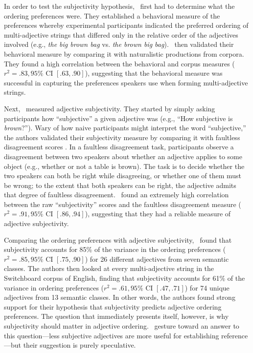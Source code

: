 \documentclass[10pt,a4paper]{article}
\begin{document}
In order to test the subjectivity hypothesis, ~first had to determine what the ordering preferences were. They established a behavioral measure of the preferences whereby experimental participants indicated the preferred ordering of multi-adjective strings that differed only in the relative order of the adjectives involved (e.g., \emph{the big brown bag} vs. \emph{the brown big bag}). ~then validated their behavioral measure by comparing it with naturalistic productions from corpora. They found a high correlation between the behavioral and corpus measures ($r^{2}=.83, 95\%$ CI $[.63, .90]$), suggesting that the behavioral measure was successful in capturing the preferences speakers use when forming multi-adjective strings.

Next, ~measured adjective subjectivity. They started by simply asking participants how ``subjective'' a given adjective was (e.g., ``How subjective is \emph{brown}?''). Wary of how naive participants might interpret the word ``subjective,'' the authors validated their subjectivity measure by comparing it with faultless disagreement scores \cite{kolbel2004,barker2013,kennedy2013,macfarlane2014}. In a faultless disagreement task, participants observe a disagreement between two speakers about whether an adjective applies to some object (e.g., whether or not a table is brown). The task is to decide whether the two speakers can both be right while disagreeing, or whether one of them must be wrong; to the extent that both speakers can be right, the adjective admits that degree of faultless disagreement. ~found an extremely high correlation between the raw ``subjectivity'' scores and the faultless disagreement measure ($r^{2}=.91, 95\%$ CI $[.86, .94]$), suggesting that they had a reliable measure of adjective subjectivity.

Comparing the ordering preferences with adjective subjectivity, ~found that subjectivity accounts for 85\% of the variance in the ordering preferences ($r^{2}=.85, 95\%$ CI $[.75, .90]$) for 26 different adjectives from seven semantic classes. The authors then looked at every multi-adjective string in the Switchboard corpus of English, finding that subjectivity accounts for 61\% of the variance in ordering preferences ($r^{2}=.61, 95\%$ CI $[.47, .71]$) for 74 unique adjectives from 13 semantic classes. In other words, the authors found strong support for their hypothesis that subjectivity predicts adjective ordering preferences. The question that immediately presents itself, however, is why subjectivity should matter in adjective ordering. ~gesture toward an answer to this question---less subjective adjectives are more useful for establishing reference---but their suggestion is purely speculative.
\end{document}
